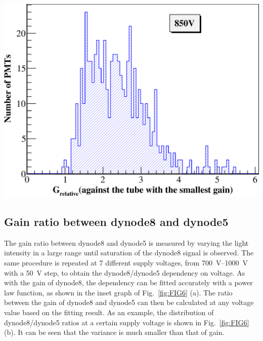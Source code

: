 \documentclass[a4paper,10pt,twoside]{cpc-hepnp}
\begin{document}
\begin{multicols}{2}
\begin{center}
	\includegraphics[width=\linewidth]{FIG5}
\end{center}

\subsection{Gain ratio between dynode8 and dynode5}
\label{sec:psd_dy58}

The gain ratio between dynode8 and dynode5 is measured by varying the light intensity in a large range until saturation of the dynode8 signal is observed.
The same procedure is repeated at 7 different supply voltages, from \SIrange{700}{1000}{\volt} with a \SI{50}{\volt} step, to obtain the dynode8/dynode5 dependency on voltage.
As with the gain of dynode8, the dependency can be fitted accurately with a power law function, as shown in the inset graph of Fig.~\ref{fig:FIG6} (a).
The ratio between the gain of dynode8 and dynode5 can then be calculated at any voltage value based on the fitting result.
As an example, the distribution of dynode8/dynode5 ratios at a certain supply voltage is shown in Fig.~\ref{fig:FIG6} (b).
It can be seen that the variance is much smaller than that of gain.


\end{multicols}
\end{document}
